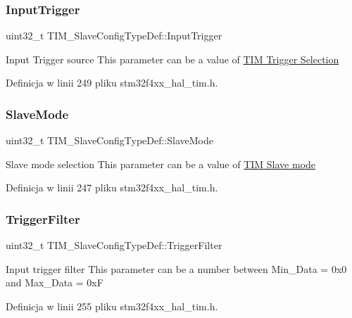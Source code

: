 \subsubsection{\texorpdfstring{Input\+Trigger}{InputTrigger}}
{\footnotesize\ttfamily uint32\+\_\+t T\+I\+M\+\_\+\+Slave\+Config\+Type\+Def\+::\+Input\+Trigger}

Input Trigger source This parameter can be a value of \hyperlink{group___t_i_m___trigger___selection}{T\+IM Trigger Selection} 

Definicja w linii 249 pliku stm32f4xx\+\_\+hal\+\_\+tim.\+h.

\mbox{\label{struct_t_i_m___slave_config_type_def_a2792de155698128ade1e505618c1bc43}} 
\subsubsection{\texorpdfstring{Slave\+Mode}{SlaveMode}}
{\footnotesize\ttfamily uint32\+\_\+t T\+I\+M\+\_\+\+Slave\+Config\+Type\+Def\+::\+Slave\+Mode}

Slave mode selection This parameter can be a value of \hyperlink{group___t_i_m___slave___mode}{T\+IM Slave mode} 

Definicja w linii 247 pliku stm32f4xx\+\_\+hal\+\_\+tim.\+h.

\mbox{\label{struct_t_i_m___slave_config_type_def_a07d28f704576a41e37bbb7412e0fba60}} 
\subsubsection{\texorpdfstring{Trigger\+Filter}{TriggerFilter}}
{\footnotesize\ttfamily uint32\+\_\+t T\+I\+M\+\_\+\+Slave\+Config\+Type\+Def\+::\+Trigger\+Filter}

Input trigger filter This parameter can be a number between Min\+\_\+\+Data = 0x0 and Max\+\_\+\+Data = 0xF 

Definicja w linii 255 pliku stm32f4xx\+\_\+hal\+\_\+tim.\+h.

